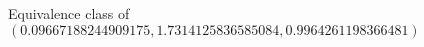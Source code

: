 \documentclass[preview]{standalone}
\begin{document}
\begin{center}
Equivalence class of $(0.09667188244909175, 1.7314125836585084, 0.9964261198366481)$
\end{center}
\end{document}
